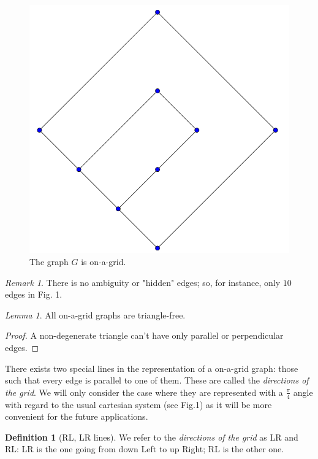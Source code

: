 \documentclass[12pt]{article}
\theoremstyle{definition}
\newtheorem{definition}{Definition}[section]
\theoremstyle{remark}
\newtheorem*{remark}{Remark}
\newtheorem{lemma}[theorem]{Lemma}
\begin{document}
\begin{figure}[h]
    \centering
    \includegraphics[scale=0.2]{tex_images/on_a_grid_g1.png}
    \caption{The graph $G$ is on-a-grid.}
\end{figure}

\begin{remark}
    There is no ambiguity or "hidden" edges; so, for instance, only $10$ edges in Fig. 1.
\end{remark}

\begin{lemma}
    All on-a-grid graphs are triangle-free.
\end{lemma}

\begin{proof}
    A non-degenerate triangle can't have only parallel or perpendicular edges.
\end{proof}

There exists two special lines in the representation of a on-a-grid graph: those such that every edge is parallel to one of them.
These are called the \textit{directions of the grid}.
We will only consider the case where they are represented with a $\tfrac{\pi}{4}$ angle with regard to the usual cartesian system (see Fig.1) as it will be more convenient for the future applications.

\begin{definition}[RL, LR lines]
    We refer to the \textit{directions of the grid} as LR and RL: LR is the one going from down Left to up Right; RL is the other one. 
\end{definition}
\end{document}
